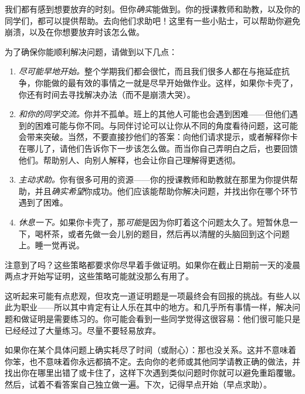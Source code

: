 \documentclass[../../../include/open-logic-section]{subfiles}
\begin{document}


我们都有感到想要放弃的时刻。但你\emph{确实}能做到。你的授课教师和助教，以及你的同学们，都可以提供帮助。去向他们求助吧！这里有一些小贴士，可以帮助你避免崩溃，以及在你想要放弃时该怎么做。

为了确保你能顺利解决问题，请做到以下几点：

\begin{enumerate}
\item \emph{尽可能早地开始。}整个学期我们都会很忙，而且我们很多人都在与拖延症抗争，你能做的最有效的事情之一就是尽早开始做作业。这样，如果你卡壳了，你还有时间去寻找解决办法（而不是崩溃大哭）。
\item \emph{和你的同学交流。}你并不孤单。班上的其他人可能也会遇到困难——但他们遇到的困难可能与你不同。与同伴讨论可以让你从不同的角度看待问题，这可能会带来突破。当然，不要直接抄他们的答案：向他们请求提示，或者解释你卡在哪儿了，请他们告诉你下一步该怎么做。而当你自己弄明白之后，也要回馈他们。帮助别人、向别人解释，也会让你自己理解得更透彻。
\item \emph{主动求助。}你有很多可用的资源——你的授课教师和助教就在那里为你提供帮助，并且\emph{确实希望}你成功。他们应该能帮助你解决问题，并找出你在哪个环节遇到了困难。
\item \emph{休息一下。}如果你卡壳了，那\emph{可能}是因为你盯着这个问题太久了。短暂休息一下，喝杯茶，或者先做一会儿别的题目，然后再以清醒的头脑回到这个问题上。睡一觉再说。
\end{enumerate}

注意到了吗？这些策略都要求你尽早着手做证明。如果你在截止日期前一天的凌晨两点才开始写证明，这些策略可能就没那么有用了。

这听起来可能有点悲观，但攻克一道证明题是一项最终会有回报的挑战。有些人以此为职业——所以其中肯定有让人乐在其中的地方。和几乎所有事情一样，解决问题和做证明是需要练习的。你可能会看到一些同学觉得这很容易：他们很可能只是已经经过了大量练习。尽量不要轻易放弃。

如果你在某个具体问题上确实耗尽了时间（或耐心）：那也没关系。这并不意味着你笨，也不意味着你永远都搞不定。去向你的老师或其他同学请教正确的做法，并找出你在哪里出错了或卡住了，这样下次遇到类似问题时你就可以避免重蹈覆辙。然后，试着不看答案自己独立做一遍。下次，记得早点开始（早点求助）。
\end{document}
